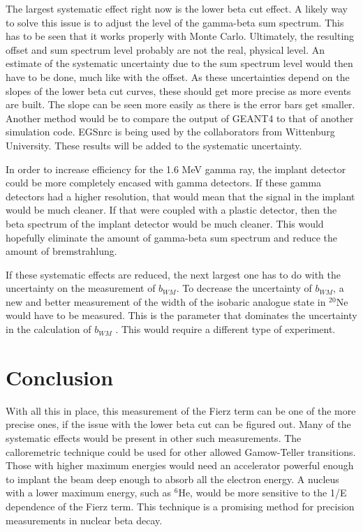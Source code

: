 \documentclass[../MaxHughesThesis.tex]{subfiles}
\begin{document}
The largest systematic effect right now is the lower beta cut effect. 
A likely way to solve this issue is to adjust the level of the gamma-beta sum spectrum.
This has to be seen that it works properly with Monte Carlo.
Ultimately, the resulting offset and sum spectrum level probably are not the real, physical level.
An estimate of the systematic uncertainty due to the sum spectrum level would then have to be done, much like with the offset.
As these uncertainties depend on the slopes of the lower beta cut curves, these should get more precise as more events are built.
The slope can be seen more easily as there is the error bars get smaller.
Another method would be to compare the output of GEANT4 to that of another simulation code.
EGSnrc is being used by the collaborators from Wittenburg University. 
These results will be added to the systematic uncertainty.

In order to increase efficiency for the 1.6 MeV gamma ray, the implant detector could be more completely encased with gamma detectors.
If these gamma detectors had a higher resolution, that would mean that the signal in the implant would be much cleaner.
If that were coupled with a plastic detector, then the beta spectrum of the implant detector would be much cleaner.
This would hopefully eliminate the amount of gamma-beta sum spectrum and reduce the amount of bremstrahlung.

If these systematic effects are reduced, the next largest one has to do with the uncertainty on the measurement of $b_{WM}$.
To decrease the uncertainty of $b_{WM}$,  a new and better measurement of the width of the isobaric analogue state in $^{20}$Ne would have to be measured.
This is the parameter that dominates the uncertainty in  the calculation of $b_{WM}$ \cite{Min11}.
This would require a different type of experiment.

\section{Conclusion}
With all this in place, this measurement of the Fierz term can be one of the more precise ones, if the issue with the lower beta cut can be figured out.
Many of the systematic effects would be present in other such measurements.
The calloremetric technique could be used for other allowed Gamow-Teller transitions.
Those with higher maximum energies would need an accelerator powerful enough to implant the beam deep enough to absorb all the electron energy.
A nucleus with a lower maximum energy, such as $^{6}$He, would be more sensitive to the 1/E dependence of the Fierz term. 
This technique is a promising method for precision measurements in nuclear beta decay.
\end{document}
